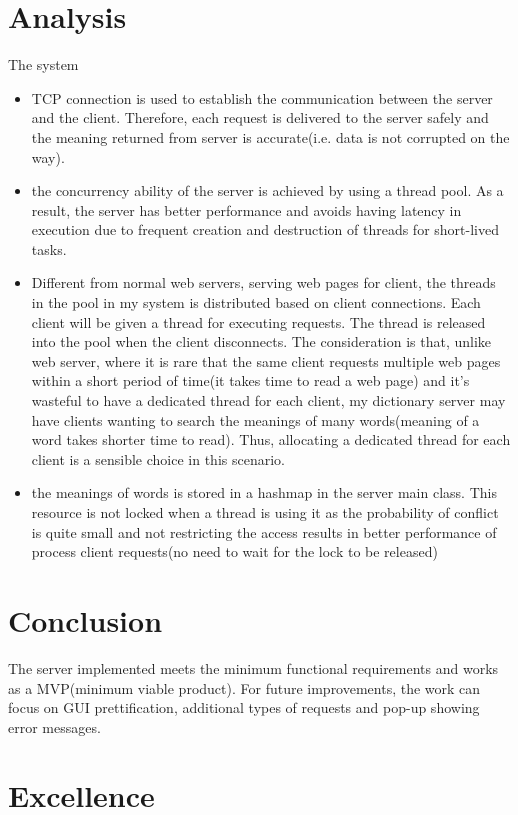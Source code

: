 \documentclass{article}
\begin{document}
\section*{Analysis}
The system
\begin{itemize}
    \item TCP connection is used to establish the communication between the server and the client. Therefore, each request is delivered to the server safely and the meaning returned from server is accurate(i.e. data is not corrupted on the way).
    \item the concurrency ability of the server is achieved by using a thread pool. As a result, the server has better performance and avoids having latency in execution due to frequent creation and destruction of threads for short-lived tasks.
    \item Different from normal web servers, serving web pages for client, the threads in the pool in my system is distributed based on client connections. Each client will be given a thread for executing requests. The thread is released into the pool when the client disconnects. The consideration is that, unlike web server, where it is rare that the same client requests multiple web pages within a short period of time(it takes time to read a web page) and it's wasteful to have a dedicated thread for each client, my dictionary server may have clients wanting to search the meanings of many words(meaning of a word takes shorter time to read). Thus, allocating a dedicated thread for each client is a sensible choice in this scenario.
    \item the meanings of words is stored in a hashmap in the server main class. This resource is not locked when a thread is using it as the probability of conflict is quite small and not restricting the access results in better performance of process client requests(no need to wait for the lock to be released)
\end{itemize}

\section*{Conclusion}
The server implemented meets the minimum functional requirements and works as a MVP(minimum viable product). For future improvements, the work can focus on GUI prettification, additional types of requests and pop-up showing error messages.
\section*{Excellence}
\end{document}

